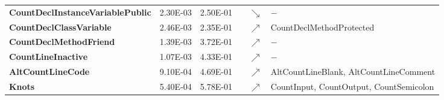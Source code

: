 \begin{sidewaystable}
\begin{tabularx}{\columnwidth}{>{\bfseries}lrrlcl}
CountDeclInstanceVariablePublic            & 2.30E-03 & 2.50E-01 &     & $\searrow$ &  $-$                                                                                                                                                                                                                                                                                                                                                                \\
CountDeclClassVariable                     & 2.46E-03 & 2.35E-01 &     & $\nearrow$ & CountDeclMethodProtected                                                                                                                                                                                                                                                                                                                                        \\
CountDeclMethodFriend                      & 1.39E-03 & 3.72E-01 &     & $\nearrow$ &     $-$                                                                                                                                                                                                                                                                                                                                                             \\
CountLineInactive                          & 1.07E-03 & 4.33E-01 &     & $\nearrow$ &    $-$                                                                                                                                                                                                                                                                                                                                                              \\
AltCountLineCode                           & 9.10E-04 & 4.69E-01 &     & $\nearrow$ & AltCountLineBlank, AltCountLineComment                                                                                                                                                                                                                                                                                                                          \\
Knots                                      & 5.40E-04 & 5.78E-01 &     & $\nearrow$ & CountInput, CountOutput, CountSemicolon                                                                                                                                                                                                                                                                                                                         \\

\end{tabularx}
\end{sidewaystable}
